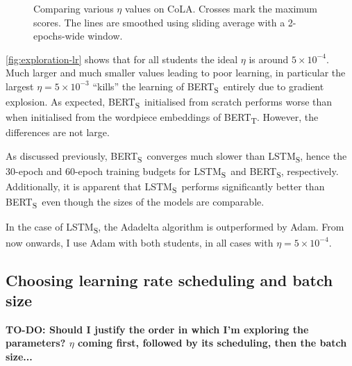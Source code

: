 \documentclass[bsc,frontabs,twoside,singlespacing,parskip,deptreport]{infthesis}
\def\BERTT{BERT\textsubscript{T}}
\def\BERTS{BERT\textsubscript{S}}
\def\LSTMS{LSTM\textsubscript{S}}
\def\sliding{The lines are smoothed using sliding average with a 2-epochs-wide window.}
\begin{document}
{{{      \begin{figure}[h!t]
        \centering
        \caption{Comparing various $\eta$ values on CoLA. Crosses mark the maximum scores. \sliding}
        \label{fig:exploration-lr}
      \end{figure}

      \autoref{fig:exploration-lr} shows that for all students the ideal $\eta$ is around $5\times10^{-4}$. Much larger and much smaller values leading to poor learning, in particular the largest $\eta=5\times10^{-3}$ ``kills'' the learning of \BERTS~entirely due to gradient explosion.
      As expected, \BERTS~initialised from scratch performs worse than when initialised from the wordpiece embeddings of \BERTT. However, the differences are not large.

      As discussed previously, \BERTS~converges much slower than \LSTMS, hence the 30-epoch and 60-epoch training budgets for \LSTMS~and \BERTS, respectively. Additionally, it is apparent that \LSTMS~performs significantly better than \BERTS~even though the sizes of the models are comparable.

      In the case of \LSTMS, the Adadelta algorithm is outperformed by Adam. From now onwards, I use Adam with both students, in all cases with $\eta=5\times10^{-4}$.
    }

    \subsection{Choosing learning rate scheduling and batch size}{
      \textbf{TO-DO: Should I justify the order in which I'm exploring the parameters? $\eta$ coming first, followed by its scheduling, then the batch size...}

}}}
\end{document}
